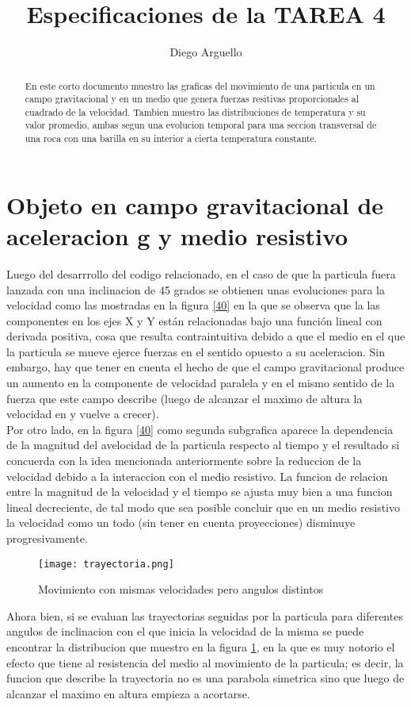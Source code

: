 \documentclass[13pts]{article}
\author{Diego Arguello}
\title{Especificaciones de la TAREA 4}
\begin{document}
\maketitle
\begin{abstract}
En este corto documento muestro las graficas del movimiento de una particula en un campo gravitacional y en un medio que genera fuerzas resitivas proporcionales al cuadrado de la velocidad. Tambien muestro las distribuciones de temperatura y su valor promedio, ambas segun una evolucion temporal para una seccion transversal de una roca con una barilla en su interior a cierta temperatura constante.
\end{abstract}
\section{Objeto en campo gravitacional de aceleracion g y medio resistivo}
Luego del desarrrollo del codigo relacionado, en el caso de que la particula fuera lanzada con una inclinacion de 45 grados se obtienen unas evoluciones para la velocidad como las mostradas en la figura \ref{40} en la que se observa que la las componentes en los ejes X y Y están relacionadas bajo una función lineal con derivada positiva, cosa que resulta contraintuitiva debido a que el medio en el que la particula se mueve ejerce fuerzas en el sentido opuesto a su aceleracion. Sin embargo, hay que tener en cuenta el hecho de que el campo gravitacional produce un aumento en la componente de velocidad paralela y en el mismo sentido de la fuerza que este campo describe (luego de alcanzar el maximo de altura la velocidad en y vuelve a crecer).\\
Por otro lado, en la figura \ref{40} como segunda subgrafica aparece la dependencia de la magnitud del avelocidad de la particula respecto al tiempo y el resultado si concuerda con la idea mencionada anteriormente sobre la reduccion de la velocidad debido a la interaccion con el medio resistivo. La funcion de relacion entre la magnitud de la velocidad y el tiempo se ajusta muy bien a una funcion lineal decreciente, de tal modo que sea posible concluir que en un medio resistivo la velocidad como un todo (sin tener en cuenta proyecciones) disminuye progresivamente.\\
\begin{figure}
	\centering
	\texttt{[image: trayectoria.png]}
	\caption{Movimiento con mismas velocidades pero angulos distintos}
	\label{trayect}
\end{figure}
Ahora bien, si se evaluan las trayectorias seguidas por la particula para diferentes angulos de inclinacion con el que inicia la velocidad de la misma se puede encontrar la distribucion que muestro en la figura \ref{trayect}, en la que es muy notorio el efecto que tiene al resistencia del medio al movimiento de la particula; es decir, la funcion que describe la trayectoria no es una parabola simetrica sino que luego de alcanzar el maximo en altura empieza a acortarse.\\
\end{document}
